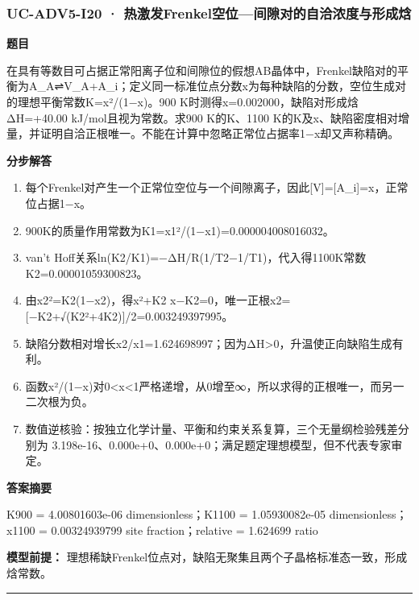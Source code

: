 \documentclass[UTF8,11pt,a4paper]{ctexart}
\begin{document}
\subsubsection*{UC-ADV5-I20 · 热激发Frenkel空位—间隙对的自洽浓度与形成焓}
\noindent\textbf{题目}\par
在具有等数目可占据正常阳离子位和间隙位的假想AB晶体中，Frenkel缺陷对的平衡为A\_A⇌V\_A+A\_i；定义同一标准位点分数x为每种缺陷的分数，空位生成对的理想平衡常数K=x²/(1−x)。900 K时测得x=0.002000，缺陷对形成焓ΔH=+40.00 kJ/mol且视为常数。求900 K的K、1100 K的K及x、缺陷密度相对增量，并证明自洽正根唯一。不能在计算中忽略正常位占据率1−x却又声称精确。\par
\medskip\noindent\textbf{分步解答}
\begin{enumerate}
\item 每个Frenkel对产生一个正常位空位与一个间隙离子，因此[V]=[A\_i]=x，正常位占据1−x。
\item 900K的质量作用常数为K1=x1²/(1−x1)=0.000004008016032。
\item van’t Hoff关系ln(K2/K1)=−ΔH/R(1/T2−1/T1)，代入得1100K常数K2=0.00001059300823。
\item 由x2²=K2(1−x2)，得x²+K2 x−K2=0，唯一正根x2=[−K2+√(K2²+4K2)]/2=0.003249397995。
\item 缺陷分数相对增长x2/x1=1.624698997；因为ΔH>0，升温使正向缺陷生成有利。
\item 函数x²/(1−x)对0<x<1严格递增，从0增至∞，所以求得的正根唯一，而另一二次根为负。
\item 数值逆核验：按独立化学计量、平衡和约束关系复算，三个无量纲检验残差分别为 3.198e-16、0.000e+0、0.000e+0；满足题定理想模型，但不代表专家审定。
\end{enumerate}
\noindent\textbf{答案摘要}\par
K900 = 4.00801603e-06 dimensionless；K1100 = 1.05930082e-05 dimensionless；x1100 = 0.00324939799 site fraction；relative = 1.624699 ratio\par
\noindent\textbf{模型前提：}
理想稀缺Frenkel位点对，缺陷无聚集且两个子晶格标准态一致，形成焓常数。\par
\medskip\hrule\medskip
{}
\end{document}
